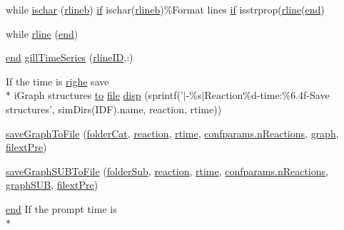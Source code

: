\begin{DoxyCompactItemize}
\item 
while \hyperlink{a00028_aaa2ace52a161710427bdc25dd600089b}{ischar} (\hyperlink{a00028_a8df79027fd85d4a3668754f36e9e88c1}{rlineb}) \hyperlink{a00030_a01d55766b8058903dd360b4bda71f9f5}{if} ischar(\hyperlink{a00028_a8df79027fd85d4a3668754f36e9e88c1}{rlineb})\%Format lines \hyperlink{a00030_a01d55766b8058903dd360b4bda71f9f5}{if} isstrprop(\hyperlink{a00028_ab5b947e1a8b7cf496ffd4eb21317052e}{rline}(\hyperlink{a00025_afb358f48b1646c750fb9da6c6585be2b}{end})
\item 
while \hyperlink{a00028_ab5b947e1a8b7cf496ffd4eb21317052e}{rline} (\hyperlink{a00025_afb358f48b1646c750fb9da6c6585be2b}{end})
\item 
\hyperlink{a00025_afb358f48b1646c750fb9da6c6585be2b}{end} \hyperlink{a00028_ac62d9b6e4b7257c90322e20e1eb8e733}{gill\-Time\-Series} (\hyperlink{a00028_a8443a49765859a8631fed7e8a1d27fe5}{rline\-I\-D},\-:)
\item 
If the time is \hyperlink{a00066_abdf49e297e2c121f2d09f075ac3d518a}{righe} save \\*
i\-Graph structures \hyperlink{a00028_af71dbe52628a3f83a77ab494817525c6}{to} \hyperlink{a00068_a4e8353d6c62cf54bf4a1a8f63e56b8c3}{file} \hyperlink{a00028_afa2000dd097bd23eb8be232e0bdfeb4d}{disp} (sprintf('$|$-\/\%s$|$Reaction\%d-\/time\-:\%6.\-4f-\/\-Save structures', sim\-Dirs(\-I\-D\-F).\-name, reaction, rtime))
\item 
\hyperlink{a00028_ab80c851bb58475542f68e7585b2b1948}{save\-Graph\-To\-File} (\hyperlink{a00028_ac4793cb55101110d228ded89ce9caa48}{folder\-Cat}, \hyperlink{a00028_a4ba2ecb46f808729569ecce2cc1d34c6}{reaction}, \hyperlink{a00028_afc6b38657a313b9f1de2ee356910b6ee}{rtime}, \hyperlink{a00071_a8d704532b4b419f1428cb078bb5c7ffe}{confparams.\-n\-Reactions}, \hyperlink{a00028_a2745e24fec2a44d51f4452beb1596bd3}{graph}, \hyperlink{a00028_a527736a425f4f7ead2c2dc9d7b479346}{filext\-Pre})
\item 
\hyperlink{a00028_af8c5bdc8ca3fe8ddcc8594ecad80560a}{save\-Graph\-S\-U\-B\-To\-File} (\hyperlink{a00028_a05c5bf0305e5d58d4dc25bd89a025678}{folder\-Sub}, \hyperlink{a00028_a4ba2ecb46f808729569ecce2cc1d34c6}{reaction}, \hyperlink{a00028_afc6b38657a313b9f1de2ee356910b6ee}{rtime}, \hyperlink{a00071_a8d704532b4b419f1428cb078bb5c7ffe}{confparams.\-n\-Reactions}, \hyperlink{a00028_acd499d32ebba9c935bab9a19da7a174b}{graph\-S\-U\-B}, \hyperlink{a00028_a527736a425f4f7ead2c2dc9d7b479346}{filext\-Pre})
\item 
\hyperlink{a00025_afb358f48b1646c750fb9da6c6585be2b}{end} If the prompt time is \\*

\end{DoxyCompactItemize}
